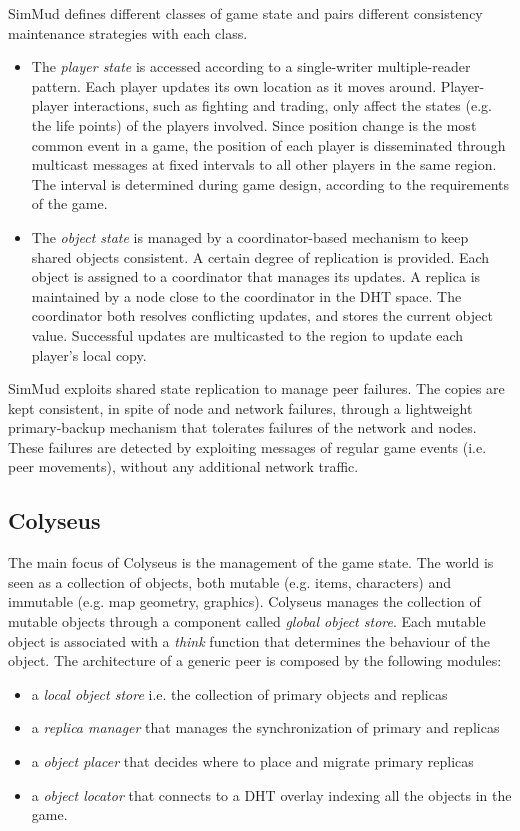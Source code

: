 \documentclass[final,10pt,a5paper]{phdimt}
\theoremstyle{definition}
\begin{document}
SimMud defines different classes of game state and pairs different consistency maintenance strategies with each class.
\begin{itemize}
\item The \emph{player state} is accessed according to a single-writer multiple-reader pattern. Each player updates its own location as it moves around. Player-player interactions, such as fighting and trading, only affect the states (e.g. the life points) of the players involved. Since position change is the most common event in a game, the position of each player is disseminated through multicast messages at fixed intervals to all other players in the same region. The interval is determined during game design, according to the requirements of the game.

\item The \emph{object state} is managed by a coordinator-based mechanism to keep shared objects consistent. A certain degree of replication is provided. Each object is assigned to a coordinator that manages its updates. A replica is maintained by a node close to the coordinator in the DHT space. 
The coordinator both resolves conflicting updates, and stores the current object value. 
Successful updates are multicasted to the region to update each player's local copy.
\end{itemize}

SimMud exploits shared state replication to manage peer failures. 
The copies are kept consistent, in spite of node and network failures, through a lightweight primary-backup mechanism that tolerates failures of the network and nodes. These failures are detected by exploiting messages of regular game events (i.e. peer movements), without any additional network traffic.

\subsection{Colyseus}


The main focus of Colyseus \cite{Bharambea} is the management of the game state. The world is seen as a collection of objects, both mutable (e.g. items, characters) and immutable (e.g. map geometry, graphics). Colyseus manages the collection of mutable objects through a component called \textit{global object store}. Each mutable object is associated with a \textit{think} function that determines the behaviour of the object.
The architecture of a generic peer is composed by the following modules:
\begin{itemize}
\item a \textit{local object store} i.e. the collection of primary objects and replicas
\item a \textit{replica manager} that manages the synchronization of primary and replicas
\item a \textit{object placer} that decides where to place and migrate primary replicas
\item a \textit{object locator} that connects to a DHT overlay indexing all the objects in the game. 
\end{itemize}
\end{document}
